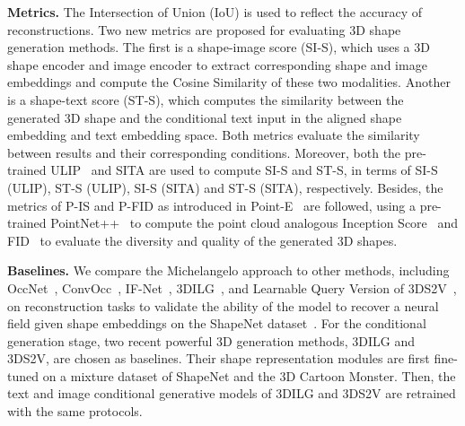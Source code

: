 \documentclass[../../book-main.tex]{subfiles}
\begin{document}
\textbf{Metrics.}
The Intersection of Union (IoU) is used to reflect the accuracy of
reconstructions. Two new metrics are proposed for evaluating 3D shape
generation methods. The first is a shape-image score (SI-S), which
uses a 3D shape encoder and image encoder to extract corresponding
shape and image embeddings and compute the Cosine Similarity of these
two modalities. Another is a shape-text score (ST-S), which computes
the similarity between the generated 3D shape and the conditional
text input in the aligned shape embedding and text embedding space.
Both metrics evaluate the similarity between results and their
corresponding conditions. Moreover, both the pre-trained
ULIP~\cite{10203465} and SITA are used to compute SI-S and ST-S, in
terms of SI-S (ULIP), ST-S (ULIP), SI-S (SITA) and ST-S (SITA),
respectively. Besides, the metrics of P-IS and P-FID as introduced in
Point-E~\cite{nichol2022point} are followed, using a pre-trained
PointNet++~\cite{NIPS2017_d8bf84be} to compute the point cloud
analogous Inception Score~\cite{NIPS2016_8a3363ab} and
FID~\cite{NIPS2017_8a1d6947} to evaluate the diversity and quality of
the generated 3D shapes.

\textbf{Baselines.}
We compare the Michelangelo approach to other methods, including
OccNet~\cite{8953655}, ConvOcc~\cite{10.1007/978-3-030-58580-8_31},
IF-Net~\cite{9156292}, 3DILG~\cite{NEURIPS2022_894ca1c4}, and
Learnable Query Version of 3DS2V~\cite{10.1145/3592442},  on
reconstruction tasks to validate the ability of the model to recover
a neural field given shape embeddings on the ShapeNet
dataset~\cite{chang2015shapenet}. For the conditional generation
stage, two recent powerful 3D generation methods, 3DILG and 3DS2V,
are chosen as baselines. Their shape representation modules are first
fine-tuned on a mixture dataset of ShapeNet and the 3D Cartoon
Monster. Then, the text and image conditional generative models of
3DILG and 3DS2V are retrained with the same protocols.
\end{document}
